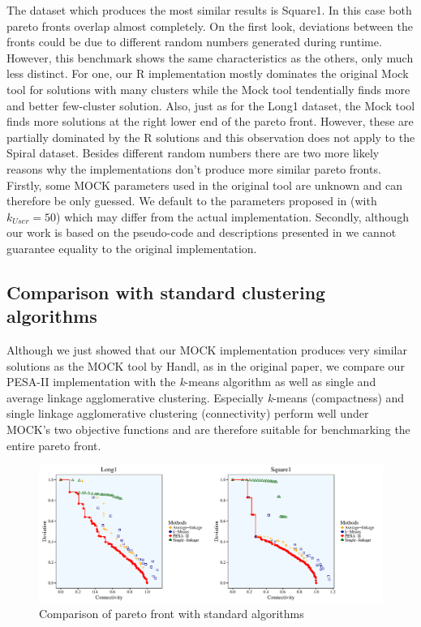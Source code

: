 \documentclass[parskip=half,DIV=14]{scrartcl}\usepackage[]{graphicx}\usepackage[]{color}
\begin{document}
The dataset which produces the most similar results is Square1. In this case both pareto fronts overlap almost completely. On the first look, deviations between the fronts could be due to different random numbers generated during runtime. However, this benchmark shows the same characteristics as the others, only much less distinct. For one, our R implementation mostly dominates the original Mock tool for solutions with many clusters while the Mock tool tendentially finds more and better few-cluster solution. Also, just as for the Long1 dataset, the Mock tool finds more solutions at the right lower end of the pareto front. However, these are partially dominated by the R solutions and this observation does not apply to the Spiral dataset. Besides different random numbers there are two  more likely reasons why the implementations don’t produce more similar pareto fronts. Firstly, some MOCK parameters used in the original tool are unknown and can therefore be only guessed. We default to the parameters proposed in \cite{handl2007} (with $k_{User}=50$) which may differ from the actual implementation. Secondly, although our work is based on the pseudo-code and descriptions presented in \cite{handl2007} we cannot guarantee equality to the original implementation.

\subsection{Comparison with standard clustering algorithms}

Although we just showed that our MOCK implementation produces very similar solutions as the MOCK tool by Handl, as in the original paper\cite{handl}, we compare our PESA-II implementation with the \textit{k}-means algorithm as well as single and average linkage agglomerative clustering. Especially \textit{k}-means (compactness) and single linkage agglomerative clustering (connectivity) perform well under MOCK’s two objective functions and are therefore suitable for benchmarking the entire pareto front.
\begin{figure}[h]
\begin{center}
\includegraphics[scale=0.65]{figure/Long1Square1Benchmark.pdf}
\caption{Comparison of pareto front with standard algorithms}
\label{fig:standard}
\end{center}
\end{figure}
\end{document}

